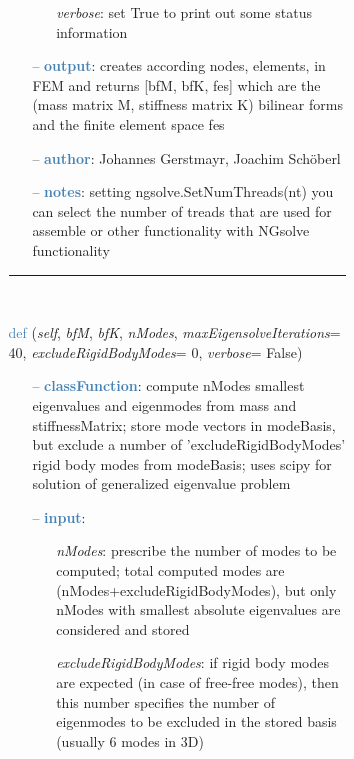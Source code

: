 \begin{itemize}[leftmargin=1.4cm]
\begin{itemize}[leftmargin=1.4cm]
\begin{itemize}[leftmargin=1.4cm]
\begin{itemize}[leftmargin=0.5cm]
\begin{itemize}[leftmargin=1.4cm]
\begin{itemize}[leftmargin=1.4cm]
\begin{itemize}[leftmargin=0.5cm]
\begin{itemize}[leftmargin=0.7cm]
\begin{itemize}[leftmargin=1.2cm]
\item[]{\it verbose}: set True to print out some status information
\end{itemize}
\item[--]\textcolor{steelblue}{\bf output}: creates according nodes, elements, in FEM and returns [bfM, bfK, fes] which are the (mass matrix M, stiffness matrix K) bilinear forms and the finite element space fes
\item[--]\textcolor{steelblue}{\bf author}: Johannes Gerstmayr, Joachim Sch\"oberl
\item[--]\textcolor{steelblue}{\bf notes}: setting ngsolve.SetNumThreads(nt) you can select the number of treads that are used for assemble or other functionality with NGsolve functionality
\vspace{12pt}\end{itemize}
%
\noindent\rule{8cm}{0.75pt}\vspace{1pt} \\ 
\begin{flushleft}
\noindent \textcolor{steelblue}{def {\bf {}}}\label{sec:FEM:FEMinterface:ComputeEigenmodesNGsolve}
({\it self}, {\it bfM}, {\it bfK}, {\it nModes}, {\it maxEigensolveIterations}= 40, {\it excludeRigidBodyModes}= 0, {\it verbose}= False)
\end{flushleft}
\setlength{\itemindent}{0.7cm}
\begin{itemize}[leftmargin=0.7cm]
\item[--]\textcolor{steelblue}{\bf classFunction}: compute nModes smallest eigenvalues and eigenmodes from mass and stiffnessMatrix; store mode vectors in modeBasis, but exclude a number of 'excludeRigidBodyModes' rigid body modes from modeBasis; uses scipy for solution of generalized eigenvalue problem
\item[--]\textcolor{steelblue}{\bf input}: \vspace{-6pt}
\begin{itemize}[leftmargin=1.2cm]
\setlength{\itemindent}{-0.7cm}
\item[]{\it nModes}: prescribe the number of modes to be computed; total computed modes are  (nModes+excludeRigidBodyModes), but only nModes with smallest absolute eigenvalues are considered and stored
\item[]{\it excludeRigidBodyModes}: if rigid body modes are expected (in case of free-free modes), then this number specifies the number of eigenmodes to be excluded in the stored basis (usually 6 modes in 3D)

\end{itemize}
\end{itemize}
\end{itemize}
\end{itemize}
\end{itemize}
\end{itemize}
\end{itemize}
\end{itemize}
\end{itemize}
